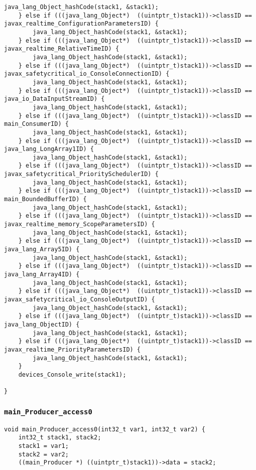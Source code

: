 \begin{landscape}
\begin{multicols}{2}
\begin{lstlisting}[firstnumber=380]
		java_lang_Object_hashCode(stack1, &stack1);
	} else if (((java_lang_Object*)  ((uintptr_t)stack1))->classID == javax_realtime_ConfigurationParametersID) {
		java_lang_Object_hashCode(stack1, &stack1);
	} else if (((java_lang_Object*)  ((uintptr_t)stack1))->classID == javax_realtime_RelativeTimeID) {
		java_lang_Object_hashCode(stack1, &stack1);
	} else if (((java_lang_Object*)  ((uintptr_t)stack1))->classID == javax_safetycritical_io_ConsoleConnectionID) {
		java_lang_Object_hashCode(stack1, &stack1);
	} else if (((java_lang_Object*)  ((uintptr_t)stack1))->classID == java_io_DataInputStreamID) {
		java_lang_Object_hashCode(stack1, &stack1);
	} else if (((java_lang_Object*)  ((uintptr_t)stack1))->classID == main_ConsumerID) {
		java_lang_Object_hashCode(stack1, &stack1);
	} else if (((java_lang_Object*)  ((uintptr_t)stack1))->classID == java_lang_LongArray1ID) {
		java_lang_Object_hashCode(stack1, &stack1);
	} else if (((java_lang_Object*)  ((uintptr_t)stack1))->classID == javax_safetycritical_PrioritySchedulerID) {
		java_lang_Object_hashCode(stack1, &stack1);
	} else if (((java_lang_Object*)  ((uintptr_t)stack1))->classID == main_BoundedBufferID) {
		java_lang_Object_hashCode(stack1, &stack1);
	} else if (((java_lang_Object*)  ((uintptr_t)stack1))->classID == javax_realtime_memory_ScopeParametersID) {
		java_lang_Object_hashCode(stack1, &stack1);
	} else if (((java_lang_Object*)  ((uintptr_t)stack1))->classID == java_lang_Array5ID) {
		java_lang_Object_hashCode(stack1, &stack1);
	} else if (((java_lang_Object*)  ((uintptr_t)stack1))->classID == java_lang_Array4ID) {
		java_lang_Object_hashCode(stack1, &stack1);
	} else if (((java_lang_Object*)  ((uintptr_t)stack1))->classID == javax_safetycritical_io_ConsoleOutputID) {
		java_lang_Object_hashCode(stack1, &stack1);
	} else if (((java_lang_Object*)  ((uintptr_t)stack1))->classID == java_lang_ObjectID) {
		java_lang_Object_hashCode(stack1, &stack1);
	} else if (((java_lang_Object*)  ((uintptr_t)stack1))->classID == javax_realtime_PriorityParametersID) {
		java_lang_Object_hashCode(stack1, &stack1);
	}
	devices_Console_write(stack1);

}
\end{lstlisting}

\subsubsection{\texttt{main\_Producer\_access0}}

\begin{lstlisting}[firstnumber=603]
void main_Producer_access0(int32_t var1, int32_t var2) {
	int32_t stack1, stack2;
	stack1 = var1;
	stack2 = var2;
	((main_Producer *) ((uintptr_t)stack1))->data = stack2;


\end{lstlisting}
\end{multicols}
\end{landscape}
